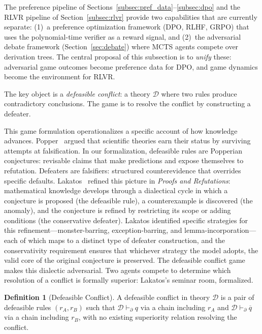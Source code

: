 \documentclass{article}
\theoremstyle{definition}
\newtheorem{definition}[theorem]{Definition}
\newcommand{\D}{\mathcal{D}}
\newcommand{\pPartial}{\vdash_{\partial}}
\newcommand{\comp}[1]{\overline{#1}}
\begin{document}
The preference pipeline of Sections~\ref{subsec:pref_data}--\ref{subsec:dpo} and the RLVR pipeline of Section~\ref{subsec:rlvr} provide two capabilities that are currently separate: (1)~a preference optimization framework (DPO, RLHF, GRPO) that uses the polynomial-time verifier as a reward signal, and (2)~the adversarial debate framework (Section~\ref{sec:debate}) where MCTS agents compete over derivation trees. The central proposal of this subsection is to \emph{unify} these: adversarial game outcomes become preference data for DPO, and game dynamics become the environment for RLVR.

The key object is a \emph{defeasible conflict}: a theory $\D$ where two rules produce contradictory conclusions. The game is to resolve the conflict by constructing a defeater.

This game formulation operationalizes a specific account of how knowledge advances. Popper~\cite{popper1959logic} argued that scientific theories earn their status by surviving attempts at falsification. In our formalization, defeasible rules are Popperian conjectures: revisable claims that make predictions and expose themselves to refutation. Defeaters are falsifiers: structured counterevidence that overrides specific defaults. Lakatos~\cite{lakatos1976proofs} refined this picture in \emph{Proofs and Refutations}: mathematical knowledge develops through a dialectical cycle in which a conjecture is proposed (the defeasible rule), a counterexample is discovered (the anomaly), and the conjecture is refined by restricting its scope or adding conditions (the conservative defeater). Lakatos identified specific strategies for this refinement---monster-barring, exception-barring, and lemma-incorporation---each of which maps to a distinct type of defeater construction, and the conservativity requirement ensures that whichever strategy the model adopts, the valid core of the original conjecture is preserved. The defeasible conflict game makes this dialectic adversarial. Two agents compete to determine which resolution of a conflict is formally superior: Lakatos's seminar room, formalized.

\begin{definition}[Defeasible Conflict]\label{def:conflict}
A defeasible conflict in theory $\D$ is a pair of defeasible rules $(r_A, r_B)$ such that $\D \pPartial q$ via a chain including $r_A$ and $\D \pPartial \comp{q}$ via a chain including $r_B$, with no existing superiority relation resolving the conflict.
\end{definition}
\end{document}
